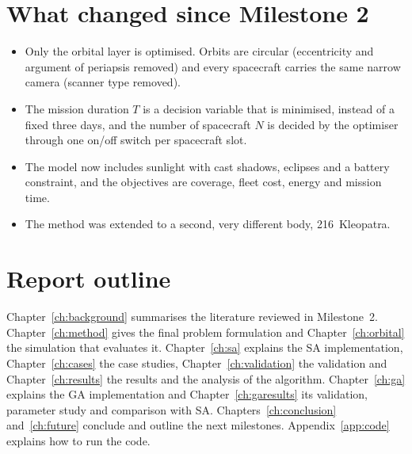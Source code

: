 \section{What changed since Milestone 2}
\begin{itemize}
\item Only the orbital layer is optimised. Orbits are circular (eccentricity and argument of
periapsis removed) and every spacecraft carries the same narrow camera (scanner type removed).
\item The mission duration $T$ is a decision variable that is minimised, instead of a fixed three
days, and the number of spacecraft $N$ is decided by the optimiser through one on/off switch per
spacecraft slot.
\item The model now includes sunlight with cast shadows, eclipses and a battery constraint, and the
objectives are coverage, fleet cost, energy and mission time.
\item The method was extended to a second, very different body, 216~Kleopatra.
\end{itemize}

\section{Report outline}
Chapter~\ref{ch:background} summarises the literature reviewed in Milestone~2.
Chapter~\ref{ch:method} gives the final problem formulation and Chapter~\ref{ch:orbital} the
simulation that evaluates it. Chapter~\ref{ch:sa} explains the \ac{SA} implementation,
Chapter~\ref{ch:cases} the case studies, Chapter~\ref{ch:validation} the validation and
Chapter~\ref{ch:results} the results and the analysis of the algorithm.
Chapter~\ref{ch:ga} explains the \ac{GA} implementation and Chapter~\ref{ch:garesults} its
validation, parameter study and comparison with \ac{SA}.
Chapters~\ref{ch:conclusion} and~\ref{ch:future} conclude and outline the next milestones.
Appendix~\ref{app:code} explains how to run the code.
